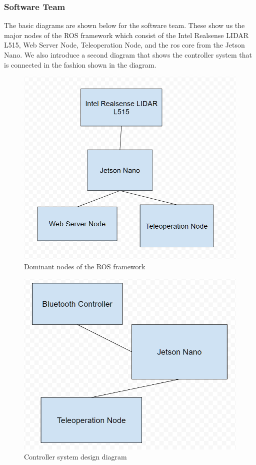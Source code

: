 \documentclass[a4paper, 10pt]{article}
\begin{document}
        \subsubsection{Software Team}
        The basic diagrams are shown below for the software team. These show us the major nodes of the ROS framework which consist of the Intel Realsense LIDAR L515, Web Server Node, Teleoperation Node, and the ros core from the Jetson Nano.
        We also introduce a second diagram that shows the controller system that is connected in the fashion shown in the diagram.
        \begin{figure} [!h]
			\centering
			\includegraphics[scale=0.35]{Photos/LIDAR nodes}
			\caption{Dominant nodes of the ROS framework}
			\label{dominant_nodes}
		\end{figure}

        \begin{figure} [!h]
			\centering
			\includegraphics[scale=0.35]{Photos/controller node}
			\caption{Controller system design diagram}
			\label{control_nodes}
		\end{figure}
\end{document}

